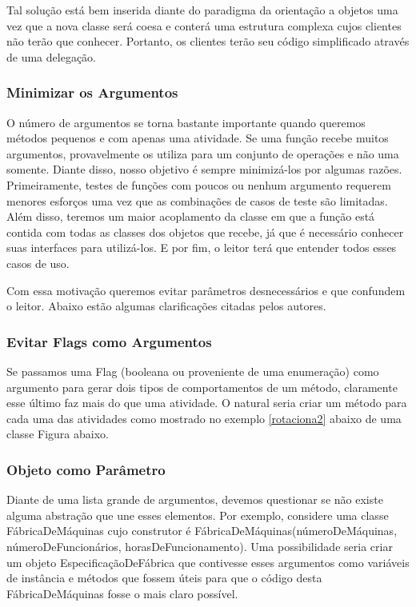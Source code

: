 Tal solução está bem inserida diante do paradigma da orientação a objetos uma vez que a nova  classe será coesa e conterá uma estrutura complexa cujos clientes não terão que conhecer. Portanto, os clientes terão seu código simplificado através de uma delegação.

\subsubsection{Minimizar os Argumentos}
O número de argumentos se torna bastante importante quando queremos métodos pequenos e com apenas uma atividade. Se uma função recebe muitos argumentos, provavelmente os utiliza para um conjunto de operações e não uma somente. Diante disso, nosso objetivo é sempre minimizá-los por algumas razões. 	Primeiramente, testes de funções com poucos ou nenhum argumento requerem menores esforços  uma vez que as combinações de casos de teste são limitadas. Além disso, teremos um maior acoplamento da classe em que a função está contida com todas as classes dos objetos que recebe, já que é necessário conhecer suas interfaces para utilizá-los. E por fim, o leitor terá que entender todos esses casos de uso.

Com essa motivação queremos evitar parâmetros desnecessários e que confundem o leitor. Abaixo estão algumas clarificações citadas pelos autores.

\subsubsection{Evitar Flags como Argumentos}
Se passamos uma Flag (booleana ou proveniente de uma enumeração) como argumento para gerar dois tipos de comportamentos de um método, claramente esse último faz mais do que uma atividade. O natural seria criar um método para cada uma das atividades como mostrado no exemplo \ref{rotaciona2} abaixo de uma classe Figura abaixo.




\subsubsection{Objeto como Parâmetro}
Diante de uma lista grande de argumentos, devemos questionar se não existe alguma abstração que une esses elementos. Por exemplo, considere uma classe FábricaDeMáquinas cujo construtor é FábricaDeMáquinas(númeroDeMáquinas, númeroDeFuncionários, horasDeFuncionamento). Uma possibilidade seria criar um objeto EspecificaçãoDeFábrica que contivesse esses argumentos como variáveis de instância e métodos que fossem úteis para que o código desta FábricaDeMáquinas fosse o mais claro possível.

